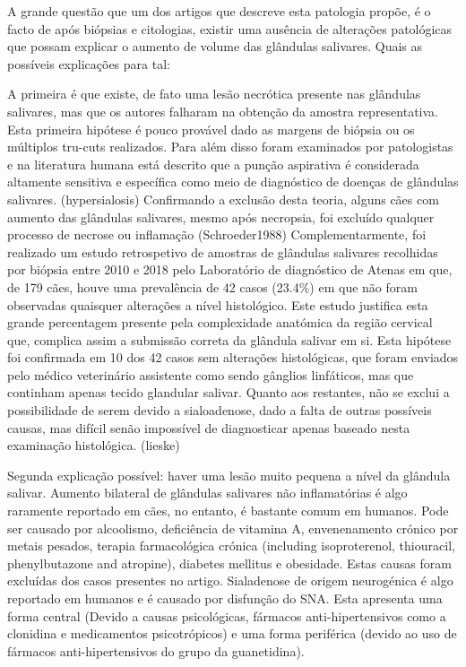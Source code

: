 A grande questão que um dos artigos que descreve esta patologia propõe, é o facto de após biópsias e citologias, existir uma ausência de alterações patológicas que possam explicar o aumento de volume das glândulas salivares.
Quais as possíveis explicações para tal:


A primeira é que existe, de fato uma lesão necrótica presente nas glândulas salivares, mas que os autores falharam na obtenção da amostra representativa. Esta primeira hipótese é pouco provável dado as margens de biópsia ou os múltiplos tru-cuts realizados. Para além disso foram examinados por patologistas e na literatura humana está descrito que a punção aspirativa é considerada altamente sensitiva e específica como meio de diagnóstico de doenças de glândulas salivares. (hypersialosis) Confirmando a exclusão desta teoria, alguns cães com aumento das glândulas salivares, mesmo após necropsia, foi excluído qualquer processo de necrose ou inflamação (Schroeder1988) Complementarmente, foi realizado um estudo retrospetivo de amostras de glândulas salivares recolhidas por biópsia entre 2010 e 2018 pelo Laboratório de diagnóstico de Atenas em que, de 179 cães, houve uma prevalência de 42 casos (23.4\%) em que não foram observadas quaisquer alterações a nível histológico. Este estudo justifica esta grande percentagem presente pela complexidade anatómica da região cervical que, complica assim a submissão correta da glândula salivar em si. Esta hipótese foi confirmada em 10 dos 42 casos sem alterações histológicas, que foram enviados pelo médico veterinário assistente como sendo gânglios linfáticos, mas que continham apenas tecido glandular salivar. Quanto aos restantes, não se exclui a possibilidade de serem devido a sialoadenose, dado a falta de outras possíveis causas, mas difícil senão impossível de diagnosticar apenas baseado nesta examinação histológica. (lieske)


Segunda explicação possível: haver uma lesão muito pequena a nível da glândula salivar. Aumento bilateral de glândulas salivares não inflamatórias é algo raramente reportado em cães, no entanto, é bastante comum em humanos. Pode ser causado por alcoolismo, deficiência de vitamina A, envenenamento crónico por metais pesados, terapia farmacológica crónica (including isoproterenol, thiouracil, phenylbutazone and atropine), diabetes mellitus e obesidade. Estas causas foram excluídas dos casos presentes no artigo. Sialadenose de origem neurogénica é algo reportado em humanos e é causado por disfunção do SNA. Esta apresenta uma forma central (Devido a causas psicológicas, fármacos anti-hipertensivos como a clonidina e medicamentos psicotrópicos) e uma forma periférica (devido ao uso de fármacos anti-hipertensivos do grupo da guanetidina).

